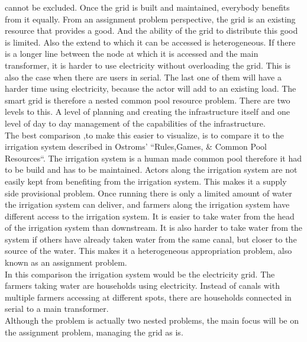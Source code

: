 \documentclass[a4paper]{article}
\begin{document}
cannot be excluded. Once the grid is built and maintained, everybody benefits from it equally. 
From an assignment problem perspective, the grid is an existing resource that provides a good. 
And the ability of the grid to distribute this good is limited. 
Also the extend to which it can be accessed is heterogeneous.
If there is a longer line between the node at which it is accessed and the main transformer, it is harder to use electricity without 
overloading the grid. 
This is also the case when there are users in serial. 
The last one of them will have a harder time using electricity, because the actor will add to an existing load. 
The smart grid is therefore a nested common pool resource problem. 
There are two levels to this. A level of planning and creating the infrastructure itself  and one level of day to day management of the 
capabilities of the infrastructure. \\
The best comparison ,to make this easier to visualize, is to compare it to the irrigation system described in Ostroms' 
``Rules,Games, \& Common Pool Resources``. The irrigation system is a human made common pool therefore it had to be build and has to be 
maintained. Actors along the irrigation system are not easily kept from benefiting from the irrigation system. This makes it a
supply side provisional problem. Once running there is only a limited amount of water the irrigation system can deliver, and farmers
along the irrigation system have different access to the irrigation system. It is easier to take water from the head of the 
irrigation system than downstream. It is also harder to take water from the system if others have already taken water from the 
same canal, but closer to the source of the water. This makes it a heterogeneous appropriation problem, also known as an assignment 
problem. \\
In this comparison the irrigation system would be the electricity grid. The farmers taking water are households using electricity. 
Instead of canals with multiple farmers accessing at different spots, there are households connected in serial to a main 
transformer.\\
Although the problem is actually two nested problems, the main focus will be on the assignment problem, managing the 
grid as is. 


\end{document}
